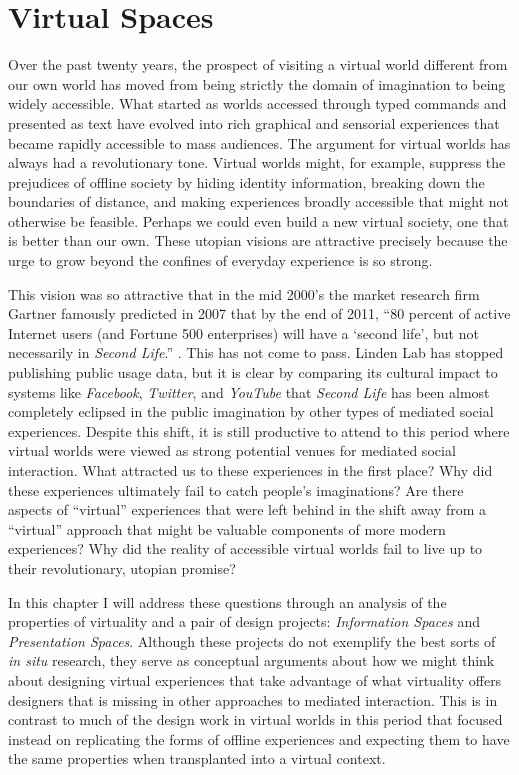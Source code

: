 \chapter{Virtual Spaces}


Over the past twenty years, the prospect of visiting a virtual world different from our own world has moved from being strictly the domain of imagination to being widely accessible. What started as worlds accessed through typed commands and presented as text have evolved into rich graphical and sensorial experiences that became rapidly accessible to mass audiences. The argument for virtual worlds has always had a revolutionary tone. Virtual worlds might, for example, suppress the prejudices of offline society by hiding identity information, breaking down the boundaries of distance, and making experiences broadly accessible that might not otherwise be feasible. Perhaps we could even build a new virtual society, one that is better than our own. These utopian visions are attractive precisely because the urge to grow beyond the confines of everyday experience is so strong.

This vision was so attractive that in the mid 2000's the market research firm Gartner famously predicted in 2007 that by the end of 2011, ``80 percent of active Internet users (and Fortune 500 enterprises) will have a `second life', but not necessarily in \emph{Second Life}.'' \citep{Anonymous:2007wz}. This has not come to pass. Linden Lab has stopped publishing public usage data, but it is clear by comparing its cultural impact to systems like \emph{Facebook}, \emph{Twitter}, and \emph{YouTube} that \emph{Second Life} has been almost completely eclipsed in the public imagination by other types of mediated social experiences. Despite this shift, it is still productive to attend to this period where virtual worlds were viewed as strong potential venues for mediated social interaction. What attracted us to these experiences in the first place? Why did these experiences ultimately fail to catch people's imaginations? Are there aspects of ``virtual'' experiences that were left behind in the shift away from a ``virtual'' approach that might be valuable components of more modern experiences? Why did the reality of accessible virtual worlds fail to live up to their revolutionary, utopian promise?

In this chapter I will address these questions through an analysis of the properties of virtuality and a pair of design projects: \emph{Information Spaces} and \emph{Presentation Spaces}. Although these projects do not exemplify the best sorts of \emph{in situ} research, they serve as conceptual arguments about how we might think about designing virtual experiences that take advantage of what virtuality offers designers that is missing in other approaches to mediated interaction. This is in contrast to much of the design work in virtual worlds in this period that focused instead on replicating the forms of offline experiences and expecting them to have the same properties when transplanted into a virtual context.

